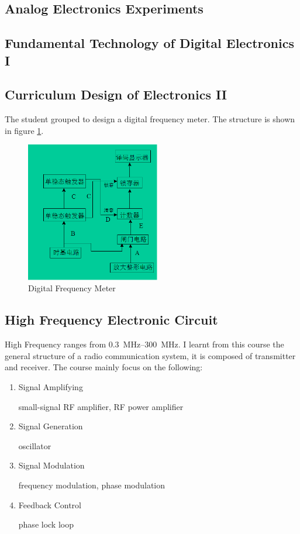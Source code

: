 \subsection{Analog Electronics Experiments}

\newpage 
\subsection{Fundamental Technology of Digital Electronics I}

\newpage

\subsection{Curriculum Design of Electronics II}

The student grouped to design a digital frequency meter. The structure is shown in figure \ref{fig_digit_meter}.

\begin{figure}
  \centering
  \includegraphics[width=2.3in]{fig/curriculum_circuit_design.png}
  \caption{Digital Frequency Meter}\label{fig_digit_meter}
\end{figure}

\subsection{High Frequency Electronic Circuit}
High Frequency ranges from \SIrange{0.3}{300}{\mega\hertz}. I learnt from this course the general structure of a radio communication system, it is composed of transmitter and receiver. The course mainly focus on the following:
\begin{enumerate}
  \item Signal Amplifying

  small-signal RF amplifier, RF power amplifier

  \item Signal Generation

  oscillator

  \item Signal Modulation

  frequency modulation, phase modulation

  \item Feedback Control

  phase lock loop
\end{enumerate}

